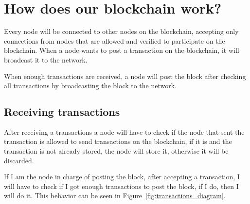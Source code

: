 \documentclass[twocolumn]{article} %
\begin{document}
\section{How does our blockchain work?}

Every node will be connected to other nodes on the blockchain, accepting only connections from nodes that are allowed and verified to participate on the blockchain. When a node wants to post a transaction on the blockchain, it will broadcast it to the network. \newline

\noindent When enough transactions are received, a node will post the block after checking all transactions by broadcasting the block to the network.

\subsection{Receiving transactions}
After receiving a transactions a node will have to check if the node that sent the transaction is allowed to send transactions on the blockchain, if it is and the transaction is not already stored, the node will store it, otherwise it will be discarded.

\noindent If I am the node in charge of posting the block, after accepting a transaction, I will have to check if I got enough transactions to post the block, if I do, then I will do it. This behavior can be seen in Figure~\ref{fig:transactions_diagram}.
\newline
\end{document}
